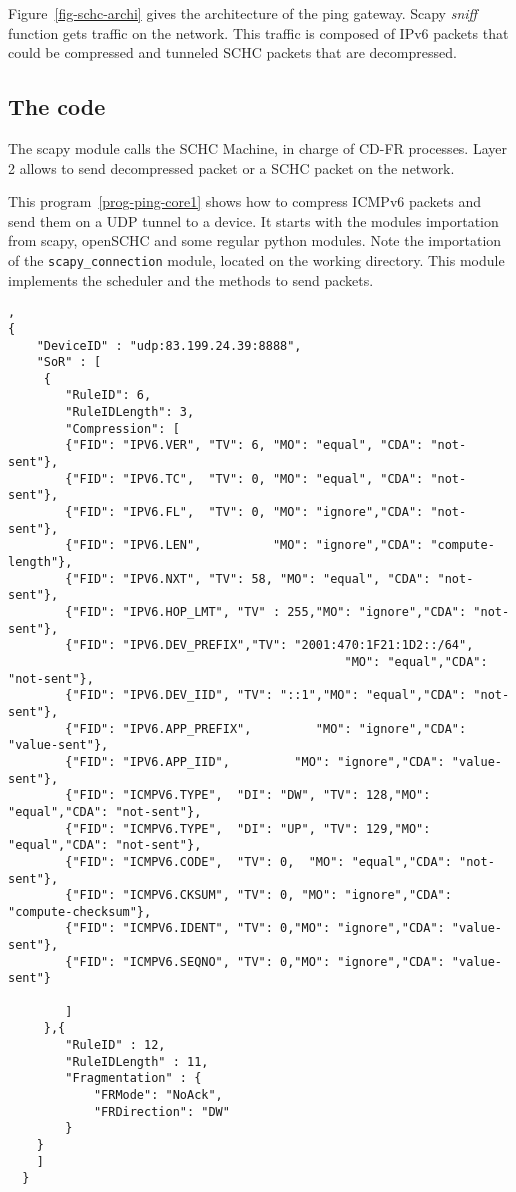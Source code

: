 Figure~\vref{fig-schc-archi} gives the architecture of the ping gateway. 
Scapy \textit{sniff} function gets traffic on the network. 
This traffic is composed of IPv6 packets that could be compressed and tunneled SCHC packets that are decompressed. 



\subsection{The code}
\label{sec-compr-code}

The scapy module calls the SCHC Machine, in charge of CD-FR processes. Layer 2 allows to send decompressed packet or a SCHC packet on the network. 





This program~\vref{prog-ping-core1} shows how to compress ICMPv6 packets and send them on a UDP tunnel to a device. It starts with the modules importation from scapy, openSCHC and some regular python modules. Note the importation of the \texttt{scapy\_connection} module, located on the working directory. This module implements the scheduler and the methods to send packets.

\begin{lstlisting}[caption={rule icmp1.json}, backgroundcolor=\color{yellow}, label=rule-icmp1, basicstyle=\ttfamily\tiny],
{
    "DeviceID" : "udp:83.199.24.39:8888",
    "SoR" : [
	 {
	    "RuleID": 6,
	    "RuleIDLength": 3,
	    "Compression": [
		{"FID": "IPV6.VER", "TV": 6, "MO": "equal", "CDA": "not-sent"},
		{"FID": "IPV6.TC",  "TV": 0, "MO": "equal", "CDA": "not-sent"},
		{"FID": "IPV6.FL",  "TV": 0, "MO": "ignore","CDA": "not-sent"},
		{"FID": "IPV6.LEN",          "MO": "ignore","CDA": "compute-length"},
		{"FID": "IPV6.NXT", "TV": 58, "MO": "equal", "CDA": "not-sent"},
		{"FID": "IPV6.HOP_LMT", "TV" : 255,"MO": "ignore","CDA": "not-sent"},
		{"FID": "IPV6.DEV_PREFIX","TV": "2001:470:1F21:1D2::/64",
                                               "MO": "equal","CDA": "not-sent"},
		{"FID": "IPV6.DEV_IID", "TV": "::1","MO": "equal","CDA": "not-sent"},
		{"FID": "IPV6.APP_PREFIX",         "MO": "ignore","CDA": "value-sent"},
		{"FID": "IPV6.APP_IID",         "MO": "ignore","CDA": "value-sent"},
		{"FID": "ICMPV6.TYPE",  "DI": "DW", "TV": 128,"MO": "equal","CDA": "not-sent"},
		{"FID": "ICMPV6.TYPE",  "DI": "UP", "TV": 129,"MO": "equal","CDA": "not-sent"},
		{"FID": "ICMPV6.CODE",  "TV": 0,  "MO": "equal","CDA": "not-sent"},
		{"FID": "ICMPV6.CKSUM", "TV": 0, "MO": "ignore","CDA": "compute-checksum"},
		{"FID": "ICMPV6.IDENT", "TV": 0,"MO": "ignore","CDA": "value-sent"},
		{"FID": "ICMPV6.SEQNO", "TV": 0,"MO": "ignore","CDA": "value-sent"}
		
	    ]
	 },{
		"RuleID" : 12,
		"RuleIDLength" : 11,
		"Fragmentation" : {
			"FRMode": "NoAck",
			"FRDirection": "DW"
		}
	} 
    ]
  }
\end{lstlisting}

